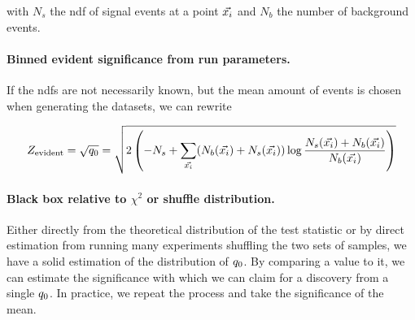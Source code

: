 \documentclass[paper/ddppaper2.tex]{subfiles}
\begin{document}
    with $N_s$ the \gls{ndf} of signal events at a point ${\vec{{x}_i}}$ and $N_b$ the number of background events.

    \paragraph{Binned evident significance from run parameters.}

    If the \glspl{ndf} are not necessarily known, but the mean amount of events is chosen when generating the datasets, we can rewrite

    \begin{wideequations}
\begin{equation}
    \label{eq:binwise_significacne}
        Z_\text{evident} = \sqrt{\invllratio} = \sqrt{
            2 \left( -N_s + \sum\limits_{\event} (N_b(\event) + N_s(\event)) \log \dfrac{N_s(\event) + N_b(\event)}{N_b(\event)} \right)
        }
    \end{equation}
\end{wideequations}

\paragraph{Black box relative to $\chi^2$ or shuffle distribution.}

Either directly from the theoretical distribution of the test statistic or by direct estimation from running many experiments shuffling the two sets of samples, we have a solid estimation of the distribution of ${q_{0}}$. By comparing a value to it, we can estimate the significance with which we can claim for a discovery from a single ${q_{0}}$. In practice, we repeat the process and take the significance of the mean.
\end{document}

